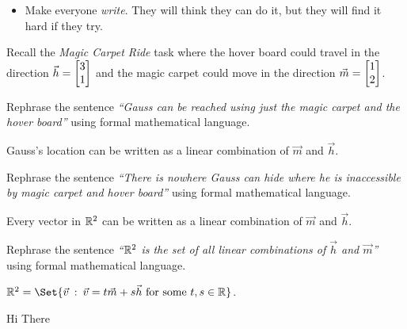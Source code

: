 \begin{slide}
	\bookonlynewpage
	\question
	\begin{annotation}
		\begin{goals}
		\end{goals}

		\begin{notes}
			\begin{itemize}
				\item Make everyone \emph{write}. They will think
					they can do it, but they will find it hard if
					they try.
			\end{itemize}
		\end{notes}
	\end{annotation}
	Recall the \emph{Magic Carpet Ride} task where the hover board could
	travel in the direction $\vec h=\mat{3\\1}$ and the magic carpet could
	move in the direction $\vec m=\mat{1\\2}$.
	\begin{parts}
		\item Rephrase the sentence \emph{``Gauss can be reached using just the
			magic carpet and the hover board''} using formal mathematical
			language.
			\begin{solution}
				Gauss's location can be written as a linear combination of
				$\vec m$ and $\vec h$.
			\end{solution}
		\item Rephrase the sentence \emph{``There is nowhere Gauss can hide
			where he is inaccessible by magic carpet and hover board''} using
			formal mathematical language.
			\begin{solution}
				Every vector in $\mathbb{R}^2$ can be written as a linear combination
				of $\vec m$ and	$\vec h$.
			\end{solution}
		\item Rephrase the sentence \emph{``$\mathbb{R}^2$ is the set of all linear
			combinations of $\vec h$ and $\vec m$''} using formal mathematical
			language.
			\begin{solution}
				$\R^2=\Set{\vec v\given \vec v=t\vec m+s\vec h\text{ for some }t,s\in \R}$.
			\end{solution}
	\end{parts}
\end{slide}
\begin{slide}
	\question
	Hi
	\question
	There

\end{slide}


